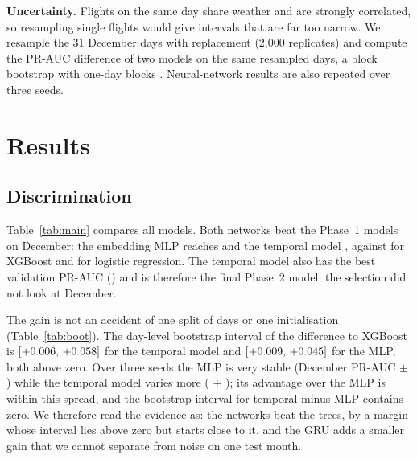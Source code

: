 \documentclass[conference]{IEEEtran}
\begin{document}
\textbf{Uncertainty.} Flights on the same day share weather and are strongly correlated,
so resampling single flights would give intervals that are far too narrow. We resample
the 31 December days with replacement (2{,}000 replicates) and compute the PR-AUC
difference of two models on the same resampled days, a block bootstrap with one-day
blocks \cite{kunsch1989}. Neural-network results are also repeated over three seeds.

\section{Results}
\subsection{Discrimination}
Table~\ref{tab:main} compares all models. Both networks beat the Phase~1 models on
December: the embedding MLP reaches \EmbeddingMlpTestPR{} and the temporal model
\TemporalTestPR{}, against \XgboostTestPR{} for XGBoost and \LrTestPR{} for logistic
regression. The temporal model also has the best validation PR-AUC (\TemporalValPR) and
is therefore the final Phase~2 model; the selection did not look at December.

\begin{table}[t]
\centering
\caption{Validation and December results (raw probabilities, seed 42). Recall@P$\geq$0.5
is read off the December curve.}
\label{tab:main}
\resizebox{\columnwidth}{!}{}
\end{table}

The gain is not an accident of one split of days or one initialisation
(Table~\ref{tab:boot}). The day-level bootstrap interval of the difference to XGBoost is
$[+0.006,\,+0.058]$ for the temporal model and
$[+0.009,\,+0.045]$ for the MLP, both above zero. Over three
seeds the MLP is very stable (December PR-AUC \MLPSeedMean{} $\pm$ \MLPSeedStd) while the
temporal model varies more (\TemporalSeedMean{} $\pm$ \TemporalSeedStd); its advantage
over the MLP is within this spread, and the bootstrap interval for temporal minus MLP
contains zero. We therefore read the evidence as: the networks beat the trees, by a
margin whose interval lies above zero but starts close to it, and the GRU adds a
smaller gain that we cannot separate from noise on one test month.

\begin{table}[t]
\centering
\caption{Paired day-level bootstrap of the December PR-AUC difference (2{,}000
replicates). ``Share $>0$'': fraction of replicates in which the first model wins.}
\label{tab:boot}
\resizebox{\columnwidth}{!}{}
\end{table}
\end{document}
